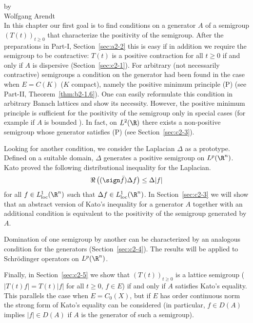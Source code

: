 \setcounter{section}{0}
\label{chap:c2}
\thispagestyle{empty}%
{\Large
\vspace*{-.75cm}
by \\[.25em]
Wolfgang Arendt
\vspace{.75cm}
\\
}
In this chapter our first goal is to find conditions on a generator $A$ of a semigroup $(T(t))_{t \geq 0}$ that characterize the positivity of the semigroup. After the preparations in Part-I, Section~\ref{sec:a2-2} this is easy if in addition we require the semigroup to be contractive: $T(t)$ is a positive contraction for all $t \geq 0$ if and only if $A$ is dispersive (Section~\ref{sec:c2-1}). 
For arbitrary (not necessarily contractive) semigroups a condition on the generator had been found in the case when $E = C(K)$ ($K$ compact), namely the positive minimum principle (P) (see Part-II, Theorem~\ref{thm:b2-1.6}). 
One can easily reformulate this condition in arbitrary Banach lattices and show its necessity. 
However, the positive minimum principle is sufficient for the positivity of the semigroup only in special cases (for example if\/ $A$ is bounded ). 
In fact, on $L^{2}(\R)$ there exists a non-positive semigroup whose generator satisfies (P) (see Section~\ref{sec:c2-3}).

Looking for another condition, we consider the Laplacian $\Delta$ as a prototype.
Defined on a suitable domain, $\Delta$ generates a positive semigroup on $L^p(\R^n)$.
Kato proved the following distributional inequality for the Laplacian.
\[
\Re \left( (\sign \bar{f}) \Delta f \right) \leq \Delta|f|
\]
for all $f \in L^1_{\text{loc}}(\R^{n})$ such that $\Delta f \in L^1_{\text{loc}}(\R^{n})$.
In Section~\ref{sec:c2-3} we will show that an abstract version of Kato's inequality for a generator $A$ together with an additional condition is equivalent to the positivity of the semigroup generated by $A$.

Domination of one semigroup by another can be characterized by an analogous condition for the generators (Section~\ref{sec:c2-4}).
The results will be applied to Schrödinger operators on $L^p(\R^n)$.

Finally, in Section~\ref{sec:c2-5} we show that $(T(t))_{t \geq 0}$ is a lattice semigroup (\ie $|T(t) f| = T(t) |f|$ for all $t \geq 0$, $f \in E$) if and only if\/ $A$ satisfies Kato's equality.
This parallels the case when $E = C_{0}(X)$, but if\/ $E$ has order continuous norm the strong form of Kato's equality can be considered (in particular, $f \in D(A)$ implies $|f| \in D(A)$ if\/ $A$ is the generator of such a semigroup).

